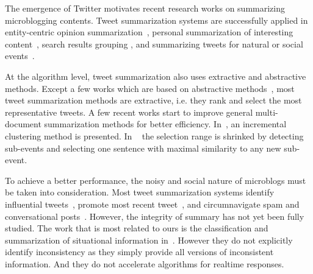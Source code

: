 \documentclass[runningheads]{llncs}
\begin{document}


The emergence of Twitter motivates recent research works on summarizing microblogging contents. Tweet summarization systems are successfully applied in entity-centric opinion summarization~\cite{Meng2012Entitycentric}, personal summarization of interesting content~\cite{Ren2013Personalized,Chin2017TOTEM}, search results grouping \cite{Mathioudakis2010TwitterMonitor}, and summarizing tweets for natural or social events~\cite{Takamura2011Summarizing,Lin2012Generating,Rudra2015Extracting,Shou2013Sumblr,Liu2016LEDS,Gillani2017Post,Zubiaga2012Towards}.

At the algorithm level, tweet summarization also uses extractive and abstractive methods. Except a few works which are based on abstractive methods~\cite{Sharifi2010Summarizing}, most tweet summarization methods are extractive, i.e. they rank and select the most representative tweets. A few recent works start to improve general multi-document summarization methods for better efficiency. In~\cite{Shou2013Sumblr}, an incremental clustering method is presented. In ~\cite{Zubiaga2012Towards} the selection range is shrinked by detecting sub-events and selecting one sentence with maximal similarity to any new sub-event.

To achieve a better performance, the noisy and social nature of microblogs must be taken into consideration. Most tweet summarization systems identify influential tweets~\cite{Hannon2010Recommending},  promote most recent tweet~\cite{Efron2011Estimation}, and circumnavigate spam and conversational posts~\cite{Gillani2017Post}. However, the integrity of summary has not yet been fully studied. The work that is most related to ours is the classification and summarization of situational information in~\cite{Rudra2015Extracting,Rudra2016Summarizing}. However they do not explicitly identify inconsistency as they simply provide all versions of inconsistent information. And they do not accelerate algorithms for realtime responses.
\end{document}
